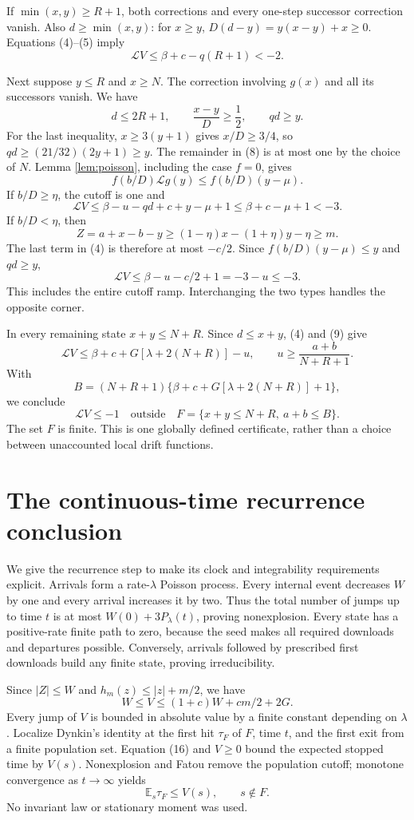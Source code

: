 \documentclass[11pt]{article}
\newcommand{\LL}{\mathcal L}
\newcommand{\E}{\mathbb E}
\begin{document}
If $\min(x,y)\ge R+1$, both corrections and every one-step successor
correction vanish. Also $d\ge\min(x,y)$: for $x\ge y$,
$D(d-y)=y(x-y)+x\ge0$. Equations (4)--(5) imply
\[
 \LL V\le\beta+c-q(R+1)<-2.                                  \tag{12}
\]

Next suppose $y\le R$ and $x\ge N$.
The correction involving $g(x)$ and all its successors vanish.
We have
\[
 d\le2R+1,\qquad \frac{x-y}D\ge\frac12,\qquad qd\ge y.          \tag{13}
\]
For the last inequality, $x\ge3(y+1)$ gives $x/D\ge3/4$, so
$qd\ge(21/32)(2y+1)\ge y$.
The remainder in (8) is at most one by the choice of $N$.
Lemma \ref{lem:poisson}, including the case $f=0$, gives
\[
 f(b/D)\LL g(y)\le f(b/D)(y-\mu).
\]
If $b/D\ge\eta$, the cutoff is one and
\[
 \LL V\le\beta-u-qd+c+y-\mu+1
             \le\beta+c-\mu+1<-3.                            \tag{14}
\]
If $b/D<\eta$, then
\[
 Z=a+x-b-y\ge(1-\eta)x-(1+\eta)y-\eta\ge m.
\]
The last term in (4) is therefore at most $-c/2$.
Since $f(b/D)(y-\mu)\le y$ and $qd\ge y$,
\[
 \LL V\le\beta-u-c/2+1=-3-u\le-3.                             \tag{15}
\]
This includes the entire cutoff ramp. Interchanging the two types
handles the opposite corner.

In every remaining state $x+y\le N+R$. Since $d\le x+y$, (4) and (9)
give
\[
 \LL V\le\beta+c+G[\lambda+2(N+R)]-u,\qquad
 u\ge\frac{a+b}{N+R+1}.
\]
With
\[
 B=(N+R+1)\{\beta+c+G[\lambda+2(N+R)]+1\},
\]
we conclude
\[
 \LL V\le-1\quad\text{outside}\quad
 F=\{x+y\le N+R,\ a+b\le B\}.                                \tag{16}
\]
The set $F$ is finite. This is one globally defined certificate,
rather than a choice between unaccounted local drift functions.

\section{The continuous-time recurrence conclusion}

We give the recurrence step to make its clock and integrability
requirements explicit. Arrivals form a rate-$\lambda$ Poisson process.
Every internal event decreases $W$ by one and every arrival increases
it by two. Thus the total number of jumps up to time $t$ is at most
$W(0)+3P_\lambda(t)$, proving nonexplosion. Every state has a
positive-rate finite path to zero, because the seed makes all required
downloads and departures possible. Conversely, arrivals followed by
prescribed first downloads build any finite state, proving
irreducibility.

Since $|Z|\le W$ and $h_m(z)\le |z|+m/2$, we have
\[
 W\le V\le (1+c)W+cm/2+2G.                                   \tag{17}
\]
Every jump of $V$ is bounded in absolute value by a finite constant
depending on $\lambda$. Localize Dynkin's identity at the first hit
$\tau_F$ of $F$, time $t$, and the first exit from a finite population
set. Equation (16) and $V\ge0$ bound the expected stopped time by
$V(s)$. Nonexplosion and Fatou remove the population cutoff; monotone
convergence as $t\to\infty$ yields
\[
                  \E_s\tau_F\le V(s),\qquad s\notin F.        \tag{18}
\]
No invariant law or stationary moment was used.
\end{document}
